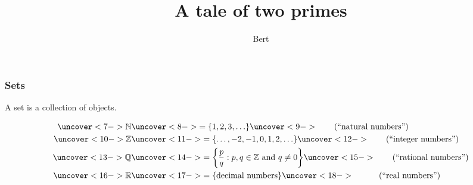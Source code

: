 \documentclass{beamer}
\author{Bert}
\title{A tale of two primes}
\begin{document}
\begin{frame}
\frametitle{Sets}

A \alert{set} is a collection of objects.





\[
\begin{split}
\uncover<7->{\mathbb{N}} &\uncover<8->{= \{1, 2, 3, \ldots\}} 
  \uncover<9->{\qquad (\text{``natural numbers''})} \\
\uncover<10->{\mathbb{Z}} &\uncover<11->{= \{\ldots, -2, -1, 0, 1, 2, \ldots\}}
  \uncover<12->{\qquad (\text{``integer numbers''})} \\
\uncover<13->{\mathbb{Q}} &\uncover<14->{= \left\{\frac{p}{q} : p, q \in \mathbb{Z} \text{ and } q \neq 0\right\}}
  \uncover<15->{\qquad (\text{``rational numbers''})} \\
\uncover<16->{\mathbb{R}} &\uncover<17->{= \{\text{decimal numbers}\}}
  \uncover<18->{\qquad\quad (\text{``real numbers''})}
\end{split}
\]

\end{frame}
\end{document}
